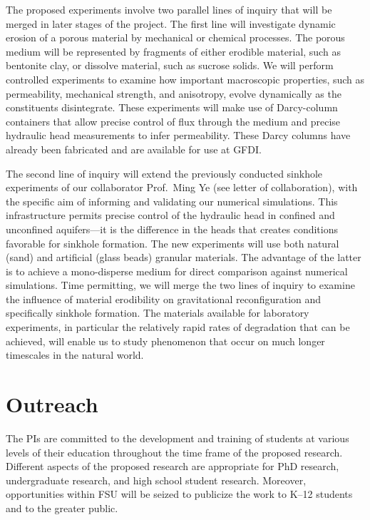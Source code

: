 \documentclass[11pt]{article}
\begin{document}
The proposed experiments involve two parallel lines of inquiry that will be merged in later stages of the project. The first line will investigate dynamic erosion of a porous material by mechanical or chemical processes. The porous medium will be represented by fragments of either erodible material, such as bentonite clay, or dissolve material, such as sucrose solids. We will perform controlled experiments to examine how important macroscopic properties, such as permeability, mechanical strength, and anisotropy, evolve dynamically as the constituents disintegrate. These experiments will make use of Darcy-column containers that allow precise control of flux through the medium and precise hydraulic head measurements to infer permeability. These Darcy columns have already been fabricated and are available for use at GFDI. 
	
The second line of inquiry will extend the previously conducted sinkhole experiments of our collaborator Prof.~Ming Ye (see letter of collaboration), with the specific aim of informing and validating our numerical simulations. This infrastructure permits precise control of the hydraulic head in confined and unconfined aquifers---it is the difference in the heads that creates conditions favorable for sinkhole formation. The new experiments will use both natural (sand) and artificial (glass beads) granular materials. The advantage of the latter is to achieve a mono-disperse medium for direct comparison against numerical simulations. Time permitting, we will merge the two lines of inquiry to examine the influence of material erodibility on gravitational reconfiguration and specifically sinkhole formation. The materials available for laboratory experiments, in particular the relatively rapid rates of degradation that can be achieved, will enable us to study phenomenon that occur on much longer timescales in the natural world.

\section{Outreach}
The PIs are committed to the development and training of students at various levels of their education throughout the time frame of the proposed research. Different aspects of the proposed research are appropriate for PhD research, undergraduate research, and high school student research. Moreover, opportunities within FSU will be seized to publicize the work to K--12 students and to the greater public.
\end{document}

